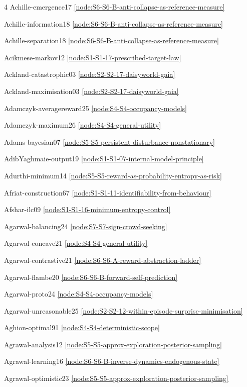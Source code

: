 \documentclass[10pt]{article}
\begin{document}
{\begin{multicols}{4}
Achille-emergence17 \hfill \ref{node:S6-S6-B-anti-collapse-as-reference-measure}\par
Achille-information18 \hfill \ref{node:S6-S6-B-anti-collapse-as-reference-measure}\par
Achille-separation18 \hfill \ref{node:S6-S6-B-anti-collapse-as-reference-measure}\par
Acikmese-markov12 \hfill \ref{node:S1-S1-17-prescribed-target-law}\par
Ackland-catastrophic03 \hfill \ref{node:S2-S2-17-daisyworld-gaia}\par
Ackland-maximisation03 \hfill \ref{node:S2-S2-17-daisyworld-gaia}\par
Adamczyk-averagereward25 \hfill \ref{node:S4-S4-occupancy-models}\par
Adamczyk-maximum26 \hfill \ref{node:S4-S4-general-utility}\par
Adams-bayesian07 \hfill \ref{node:S5-S5-persistent-disturbance-nonstationary}\par
AdibYaghmaie-output19 \hfill \ref{node:S1-S1-07-internal-model-principle}\par
Adurthi-minimum14 \hfill \ref{node:S5-S5-reward-as-probability-entropy-as-risk}\par
Afriat-construction67 \hfill \ref{node:S1-S1-11-identifiability-from-behaviour}\par
Afshar-ilc09 \hfill \ref{node:S1-S1-16-minimum-entropy-control}\par
Agarwal-balancing24 \hfill \ref{node:S7-S7-sign-crowd-seeking}\par
Agarwal-concave21 \hfill \ref{node:S4-S4-general-utility}\par
Agarwal-contrastive21 \hfill \ref{node:S6-S6-A-reward-abstraction-ladder}\par
Agarwal-flambe20 \hfill \ref{node:S6-S6-B-forward-self-prediction}\par
Agarwal-proto24 \hfill \ref{node:S4-S4-occupancy-models}\par
Agarwal-unreasonable25 \hfill \ref{node:S2-S2-12-within-episode-surprise-minimisation}\par
Aghion-optimal91 \hfill \ref{node:S4-S4-deterministic-scope}\par
Agrawal-analysis12 \hfill \ref{node:S5-S5-approx-exploration-posterior-sampling}\par
Agrawal-learning16 \hfill \ref{node:S6-S6-B-inverse-dynamics-endogenous-state}\par
Agrawal-optimistic23 \hfill \ref{node:S5-S5-approx-exploration-posterior-sampling}\par

\end{multicols}}
\end{document}
